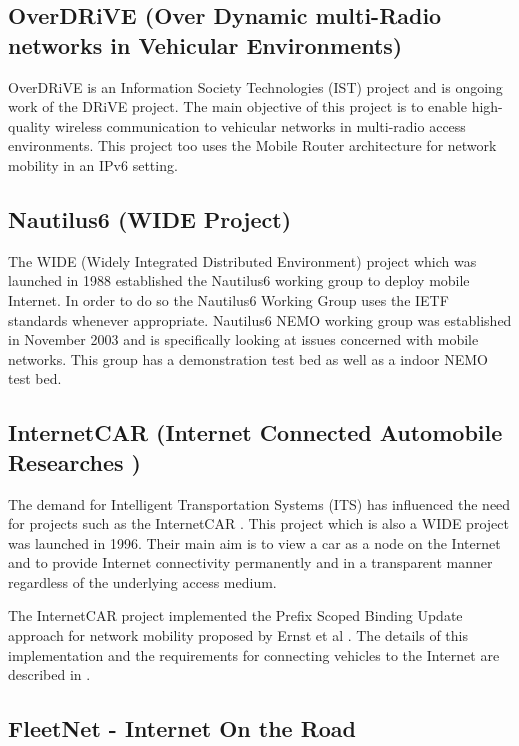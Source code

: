 \subsection{OverDRiVE (Over Dynamic multi-Radio networks in Vehicular
Environments)}

OverDRiVE \cite{46} is an Information Society Technologies (IST) project and
is ongoing work of the DRiVE \cite{47} project. The main objective of this
project is to enable high-quality wireless communication to vehicular networks
in multi-radio access environments. This project too uses the Mobile Router architecture for network mobility in an IPv6 setting.

\subsection{Nautilus6 (WIDE Project)}

The WIDE (Widely Integrated Distributed Environment) project which was
launched in 1988 established the Nautilus6 working group \cite{49} to deploy
mobile Internet. In order to do so the Nautilus6 Working Group uses the IETF
standards whenever appropriate. Nautilus6 NEMO working group was established
in November 2003 and is specifically looking at issues concerned with mobile
networks. This group has a demonstration test bed as well as a indoor
NEMO test bed.

\subsection{InternetCAR (Internet Connected Automobile Researches )}

The demand for Intelligent Transportation Systems (ITS) has influenced the
need for projects such as the InternetCAR \cite{50}. This project which is
also a WIDE project was launched in 1996. Their main aim is to view a car as a
node on the Internet and to provide Internet connectivity permanently and in a
transparent manner regardless of the underlying access medium.

The InternetCAR project implemented the Prefix Scoped Binding Update approach
for network mobility proposed by Ernst et al \cite{51}. The details of this
implementation and the requirements for connecting vehicles to the Internet
are described in \cite{52}.

\subsection{FleetNet - Internet On the Road}

